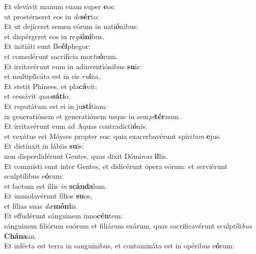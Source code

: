 \evenverse Et elevávit manum suam super \textbf{e}os:~\*\\
\evenverse ut prostérneret eos in \textit{de}\textbf{sér}to:\\
\oddverse Et ut dejíceret semen eórum in nati\textbf{ó}nibus:~\*\\
\oddverse et dispérgeret eos in re\textit{gi}\textbf{ó}\textbf{ni}bus.\\
\evenverse Et initiáti sunt Be\textbf{él}phegor:~\*\\
\evenverse et comedérunt sacrifícia mor\textit{tu}\textbf{ó}rum.\\
\oddverse Et irritavérunt eum in adinventiónibus \textbf{su}is:~\*\\
\oddverse et multiplicáta est in eis \textit{ru}\textbf{í}na.\\
\evenverse Et stetit Phínees, et pla\textbf{cá}vit:~\*\\
\evenverse et cessávit \textit{quas}\textbf{sá}\textbf{ti}o.\\
\oddverse Et reputátum est ei in ju\textbf{stí}tiam:~\*\\
\oddverse in generatiónem et generatiónem usque in sem\textit{pi}\textbf{tér}num.\\
\evenverse Et irritavérunt eum ad Aquas contradicti\textbf{ó}nis:~\*\\
\evenverse et vexátus est Móyses propter eos: quia exacerbavérunt spíri\textit{tum} \textbf{e}jus.\\
\oddverse Et distínxit in lábiis \textbf{su}is:~\*\\
\oddverse non disperdidérunt Gentes, quas dixit Dómi\textit{nus} \textbf{il}lis.\\
\evenverse Et commísti sunt inter Gentes, et didicérunt ópera eórum: et serviérunt sculptílibus e\textbf{ó}rum:~\*\\
\evenverse et factum est illis \textit{in} \textbf{scán}\textbf{da}lum.\\
\oddverse Et immolavérunt fílios \textbf{su}os,~\*\\
\oddverse et fílias suas \textit{dæ}\textbf{mó}\textbf{ni}is.\\
\evenverse Et effudérunt sánguinem inno\textbf{cén}tem:~\*\\
\evenverse sánguinem filiórum suórum et filiárum suárum, quas sacrificavérunt sculptíli\textit{bus} \textbf{Chá}\textbf{na}an.\\
\oddverse Et infécta est terra in sanguínibus, et contamináta est in opéribus e\textbf{ó}rum:~\*\\
